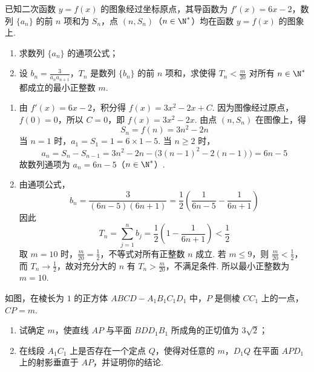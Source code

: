 \begin{problem}
已知二次函数 \(y = f(x)\) 的图象经过坐标原点，其导函数为 \(f'(x) = 6x - 2\)，数列 \(\{a_n\}\) 的前 \(n\) 项和为 \(S_n\)，点 \((n, S_n)\)（\(n \in \N^*\)）均在函数 \(y = f(x)\) 的图象上.

\begin{enumerate}
\item 求数列 \(\{a_n\}\) 的通项公式；
\item 设 \(b_n = \frac{3}{a_n a_{n+1}}\)，\(T_n\) 是数列 \(\{b_n\}\) 的前 \(n\) 项和，求使得 \(T_n < \frac{m}{20}\) 对所有 \(n \in \N^*\) 都成立的最小正整数 \(m\).
\end{enumerate}
\end{problem}

\begin{solution}
\begin{enumerate}
\item
由 \(f'(x)=6x-2\)，积分得 \(f(x)=3x^{2}-2x+C\). 因为图像经过原点，\(f(0)=0\)，所以 \(C=0\)，即 \(f(x)=3x^{2}-2x\). 由点 \((n,S_n)\) 在图像上，得
\[
S_n=f(n)=3n^{2}-2n
\]
当 \(n=1\) 时，\(a_1=S_1=1=6\times1-5\). 当 \(n\geqslant2\) 时，
\[
a_n=S_n-S_{n-1}=3n^{2}-2n-\bigl(3(n-1)^{2}-2(n-1)\bigr)=6n-5
\]
故数列通项为 \(a_n=6n-5\)（\(n\in\N^*\)）.

\item
由通项公式，
\[
b_n=\frac{3}{(6n-5)(6n+1)}=\frac12\left(\frac{1}{6n-5}-\frac{1}{6n+1}\right)
\]
因此
\[
T_n=\sum_{j=1}^{n}b_j=\frac12\left(1-\frac{1}{6n+1}\right)<\frac12
\]
取 \(m=10\) 时，\(\frac{m}{20}=\frac{1}{2}\)，不等式对所有正整数 \(n\) 成立. 若 \(m\leqslant9\)，则 \(\frac{m}{20}<\frac{1}{2}\)，而 \(T_n\to\frac{1}{2}\)，故对充分大的 \(n\) 有 \(T_n>\frac{m}{20}\)，不满足条件. 所以最小正整数为 \(m=10\).
\end{enumerate}
\end{solution}

\begin{problem}
如图，在棱长为 \(1\) 的正方体 \(ABCD - A_{1}B_{1}C_{1}D_{1}\) 中，\(P\) 是侧棱 \(CC_{1}\) 上的一点，\(CP = m\).

\begin{enumerate}
\item 试确定 \(m\)，使直线 \(AP\) 与平面 \(BDD_{1}B_{1}\) 所成角的正切值为 \(3\sqrt{2}\)；
\item 在线段 \(A_{1}C_{1}\) 上是否存在一个定点 \(Q\)，使得对任意的 \(m\)，\(D_{1}Q\) 在平面 \(APD_{1}\) 上的射影垂直于 \(AP\)，并证明你的结论.
\end{enumerate}

\end{problem}

